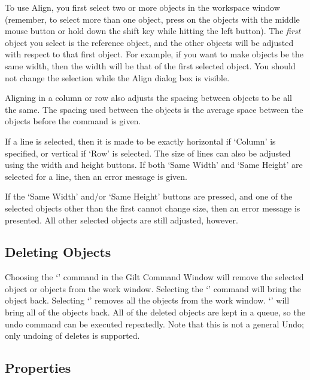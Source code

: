 To use Align, you first select two or more objects in the workspace
window (remember, to select more than one object, press on the objects
with the middle mouse button or hold down the shift key while hitting
the left button).  The {\it first} object you select is the reference
object, and the other objects will be adjusted with respect to that
first object.  For example, if you want to make objects be the same width,
then the width will be that of the first selected object.  You should
not change the selection while the Align dialog box is visible.

Aligning in a column or row also adjusts the spacing between objects
to be all the same.  The spacing used between the objects is the average
space between the objects before the command is given.

If a line is selected, then it is made to be exactly horizontal if
`Column' is specified, or vertical if `Row' is selected.  The size of
lines can also be adjusted using the width and height buttons.  If both
`Same Width' and `Same Height' are selected for a line, then an error
message is given.

If the `Same Width' and/or `Same Height' buttons are pressed, and one
of the selected objects other than the first cannot change size, then
an error message is presented.  All other selected objects are still
adjusted, however.


\begin{group}
\subsection{Deleting Objects}
\label{deleting-objects}

Choosing the `' command in the Gilt Command Window will
remove the selected object or objects from the work window.  Selecting
the `'
command will bring the object back.  Selecting `' removes all
the objects from the work window.  `' will bring all of
the objects back.  All of the deleted objects are kept in a queue, so the undo
command can be executed repeatedly.  Note that this is not a general Undo;
only undoing of deletes is supported.
\end{group}


\subsection{Properties}
\label{giltpropertiessec}

